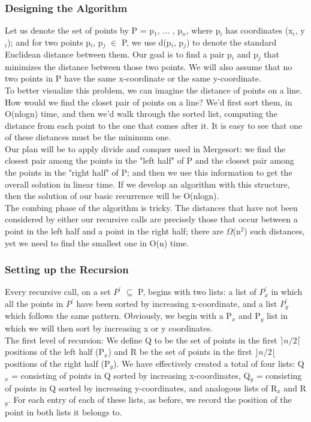 \documentclass{article}
\begin{document}
\subsubsection{Designing the Algorithm}
Let us denote the set of points by P = {p$_1$, ... , p$_n$}, where p$_i$ has coordinates (x$_i$, y$_i$); and for two points p$_i$, p$_j$ $\in$ P, we use d(p$_i$, p$_j$) to denote the standard Euclidean distance between them. Our goal is to find a pair p$_i$ and p$_j$ that minimizes the distance between those two points. We will also assume that no two points in P have the same x-coordinate or the same y-coordinate.\\

To better visualize this problem, we can imagine the distance of points on a line. How would we find the closet pair of points on a line? We'd first sort them, in O(nlogn) time, and then we'd walk through the sorted list, computing the distance from each point to the one that comes after it. It is easy to see that one of these distances must be the minimum one.\\

Our plan will be to apply divide and conquer used in Mergesort: we find the closest pair among the points in the "left half" of P and the closest pair among the points in the "right half" of P; and then we use this information to get the overall solution in linear time. If we develop an algorithm with this structure, then the solution of our basic recurrence will be O(nlogn).\\

The combing phase of the algorithm is tricky. The distances that have not been considered by either our recursive calls are precisely those that occur between a point in the left half and a point in the right half; there are $\Omega$(n$^2$) such distances, yet we need to find the smallest one in O(n) time. 

\subsubsection{Setting up the Recursion}
Every recursive call, on a set $P^\prime$ $\subseteq$ P, begins with two lists: a list of $P^\prime_x$ in which all the points in $P^\prime$ have been sorted by increasing x-coordinate, and a list $P^\prime_y$ which follows the same pattern. Obviously, we begin with a P$_x$ and P$_y$ list in which we will then sort by increasing x or y coordinates.\\
The first level of recursion: We define Q to be the set of points in the first $\rceil n/2 \lceil$ positions of the left half (P$_x$) and R be the set of points in the first $\rfloor n/2 \lfloor$ positions of the right half (P$_y$). We have effectively created a total of four lists: Q$_x$ = consisting of points in Q sorted by increasing x-coordinates, Q$_y$ = consisting of points in Q sorted by increasing y-coordinates, and analogous lists of R$_x$ and R$_y$. For each entry of each of these lists, as before, we record the position of the point in both lists it belongs to.\\
\end{document}

